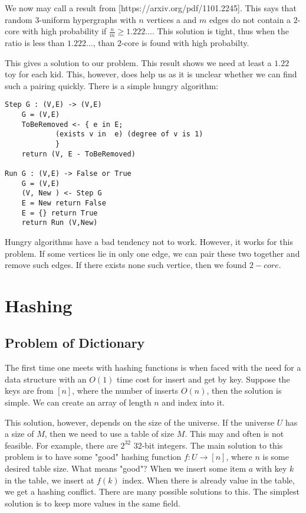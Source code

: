 We now may call a result from [https://arxiv.org/pdf/1101.2245]. This says that random 3-uniform hypergraphs with $n$ vertices a and $m$ edges do not contain a $2$-core with high probability if $\frac{n}{m} \geq 1.222\dots$. This solution is tight, thus when the ratio is less than $1.222\dots$, than $2$-core is found with high probabilty.

This gives a solution to our problem. This result shows we need at least a $1.22$ toy for each kid.
This, however, does help us as it is unclear whether we can find such a pairing quickly. There is a simple hungry algorithm:

\begin{lstlisting}
Step G : (V,E) -> (V,E)
    G = (V,E)
    ToBeRemoved <- { e in E; 
            (exists v in  e) (degree of v is 1)
            }
    return (V, E - ToBeRemoved)

Run G : (V,E) -> False or True
    G = (V,E)
    (V, New ) <- Step G 
    E = New return False
    E = {} return True
    return Run (V,New)
\end{lstlisting}
Hungry algorithms have a bad tendency not to work. However, it works for this problem. If some vertices lie in only one edge, we can pair these two together and remove such edges. If there exists none such vertice, then we found $2-core$.

\section{Hashing}

\subsection{Problem of Dictionary}
The first time one meets with hashing functions is when faced with the need for a data structure with an \(O(1)\) time cost for insert and get by key. Suppose the keys are from \([n]\), where the number of inserts \(O(n)\), then the solution is simple. We can create an array of length \(n\) and index into it. 

This solution, however, depends on the size of the universe. If the universe $U$ has a size of $M$, then we need to use a table of size $M$. This may and often is not feasible. For example, there are $2^{32}$ 32-bit integers. The main solution to this problem is to have some "good" hashing function $f:U \rightarrow [n]$, where $n$ is some desired table size. What means "good"? When we insert some item $a$ with key $k$ in the table, we insert at $f(k)$ index. When there is already value in the table, we get a hashing conflict. There are many possible solutions to this. The simplest solution is to keep more values in the same field.


